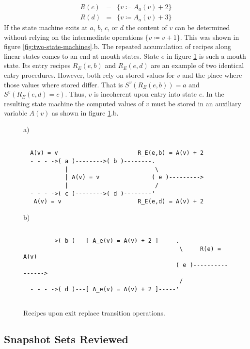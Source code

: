 \documentclass[12pt,a4paper]{scrartcl}
\begin{document}
\begin{eqnarray}
    R(c) &=&\{ v \coloneqq  A_a(v) + 2 \} \\
    R(d) &=&\{ v \coloneqq  A_a(v) + 3 \}                                 
\end{eqnarray}
If the state machine exits at $a$, $b$, $c$, or $d$ the content of $v$ can be
determined without relying on the intermediate operations $\{ v\coloneqq v+1 \}$. This
was shown in figure \ref{fig:two-state-machines}.b. 
The repeated accumulation of recipes along linear states comes to an end at
mouth states. State $e$ in figure \ref{fig:interference-example} is such a
mouth state. Its entry recipes $R_E(e,b)$ and $R_E(e,d)$ are an example of two
identical entry procedures. However, both rely on stored values for $v$ and the
place where those values where stored differ. That is $S^v(R_E(e,b))=a$ and
$S^v(R_E(e,d)=c)$. Thus, $v$ is incoherent upon entry into state $e$.  In
the resulting state machine the computed values of $v$ must be stored in an
auxiliary variable $A(v)$ as shown in figure \ref{fig:interference-example}.b.
\begin{figure}[htbp] \leavevmode \label{fig:interference-example}
a)
\begin{verbatim}

  A(v) = v                       R_E(e,b) = A(v) + 2
  - - - ->( a )-------->( b )--------.
            |                         \
            | A(v) = v               ( e )--------->
            |                         /
  - - - ->( c )-------->( d )--------'
   A(v) = v                      R_E(e,d) = A(v) + 2

\end{verbatim}
b)
\begin{verbatim}
                                 
  - - - ->( b )---[ A_e(v) = A(v) + 2 ]-----.
                                             \     R(e) = A(v)
                                            ( e )---------------->
                                             /
  - - - ->( d )---[ A_e(v) = A(v) + 2 ]-----'
                                 

\end{verbatim}
\caption{Recipes upon exit replace transition operations.}
\end{figure}

\subsection{Snapshot Sets Reviewed}
\end{document}
